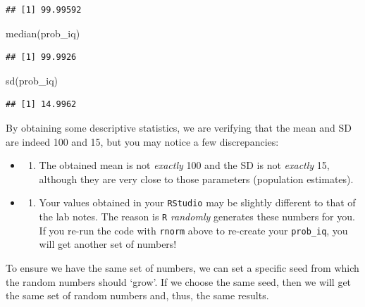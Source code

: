 \documentclass[
]{book}
\newenvironment{Shaded}{\begin{snugshade}}{\end{snugshade}}
\newcommand{\FunctionTok}[1]{\textcolor[rgb]{0.00,0.00,0.00}{#1}}
\newcommand{\NormalTok}[1]{#1}
\providecommand{\tightlist}{%
  \setlength{\itemsep}{0pt}\setlength{\parskip}{0pt}}
\begin{document}
\begin{verbatim}
## [1] 99.99592
\end{verbatim}

\begin{Shaded}
\begin{Highlighting}[]
\FunctionTok{median}\NormalTok{(prob\_iq) }
\end{Highlighting}
\end{Shaded}

\begin{verbatim}
## [1] 99.9926
\end{verbatim}

\begin{Shaded}
\begin{Highlighting}[]
\FunctionTok{sd}\NormalTok{(prob\_iq) }
\end{Highlighting}
\end{Shaded}

\begin{verbatim}
## [1] 14.9962
\end{verbatim}

By obtaining some descriptive statistics, we are verifying that the mean and SD are indeed 100 and 15, but you may notice a few discrepancies:

\begin{itemize}
\item
  \begin{enumerate}
  \def\labelenumi{\arabic{enumi}.}
  \tightlist
  \item
    The obtained mean is not \emph{exactly} 100 and the SD is not \emph{exactly} 15, although they are very close to those parameters (population estimates).
  \end{enumerate}
\item
  \begin{enumerate}
  \def\labelenumi{\arabic{enumi}.}
  \setcounter{enumi}{1}
  \tightlist
  \item
    Your values obtained in your \texttt{RStudio} may be slightly different to that of the lab notes. The reason is \texttt{R} \emph{randomly} generates these numbers for you. If you re-run the code with \texttt{rnorm} above to re-create your \texttt{prob\_iq}, you will get another set of numbers!
  \end{enumerate}
\end{itemize}

To ensure we have the same set of numbers, we can set a specific seed from which the random numbers should `grow'. If we choose the same seed, then we will get the same set of random numbers and, thus, the same results.
\end{document}
